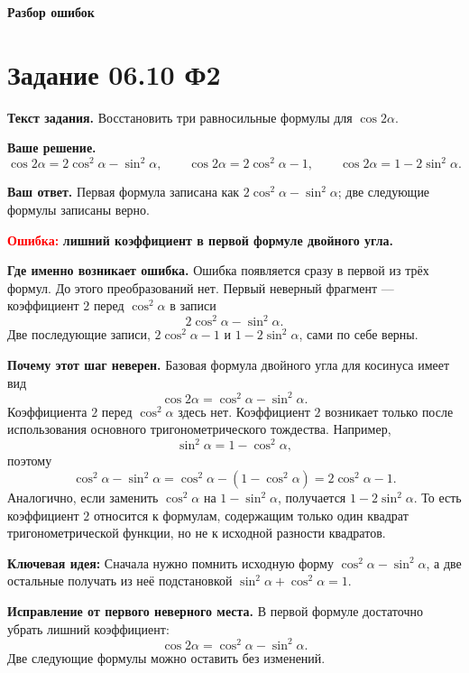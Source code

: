 \documentclass[12pt,a4paper]{article}
\newcommand{\errorlabel}[1]{\textcolor{red}{\textbf{Ошибка:}} \textbf{#1}}
\newcommand{\keyidea}{\textcolor{blue!60!black}{\textbf{Ключевая идея:}}}
\begin{document}
\newpage
\thispagestyle{review}
\vspace*{0.34\textheight}
\begin{center}
{\LARGE\bfseries Разбор ошибок}
\end{center}
\newpage

\label{task:0610f2}
\section*{Задание 06.10 Ф2}

\textbf{Текст задания.} Восстановить три равносильные формулы для $\cos 2\alpha$.

\textbf{Ваше решение.}
\[
\cos 2\alpha=2\cos^2\alpha-\sin^2\alpha,
\qquad
\cos 2\alpha=2\cos^2\alpha-1,
\qquad
\cos 2\alpha=1-2\sin^2\alpha.
\]

\textbf{Ваш ответ.} Первая формула записана как $2\cos^2\alpha-\sin^2\alpha$; две следующие формулы записаны верно.

\errorlabel{лишний коэффициент в первой формуле двойного угла.}

\textbf{Где именно возникает ошибка.} Ошибка появляется сразу в первой из трёх формул. До этого преобразований нет. Первый неверный фрагмент --- коэффициент $2$ перед $\cos^2\alpha$ в записи
\[
2\cos^2\alpha-\sin^2\alpha.
\]
Две последующие записи, $2\cos^2\alpha-1$ и $1-2\sin^2\alpha$, сами по себе верны.

\textbf{Почему этот шаг неверен.} Базовая формула двойного угла для косинуса имеет вид
\[
\cos 2\alpha=\cos^2\alpha-\sin^2\alpha.
\]
Коэффициента $2$ перед $\cos^2\alpha$ здесь нет. Коэффициент $2$ возникает только после использования основного тригонометрического тождества. Например,
\[
\sin^2\alpha=1-\cos^2\alpha,
\]
поэтому
\[
\cos^2\alpha-\sin^2\alpha
=\cos^2\alpha-(1-\cos^2\alpha)
=2\cos^2\alpha-1.
\]
Аналогично, если заменить $\cos^2\alpha$ на $1-\sin^2\alpha$, получается $1-2\sin^2\alpha$. То есть коэффициент $2$ относится к формулам, содержащим только один квадрат тригонометрической функции, но не к исходной разности квадратов.

\keyidea{} Сначала нужно помнить исходную форму $\cos^2\alpha-\sin^2\alpha$, а две остальные получать из неё подстановкой $\sin^2\alpha+\cos^2\alpha=1$.

\textbf{Исправление от первого неверного места.} В первой формуле достаточно убрать лишний коэффициент:
\[
\boxed{\cos 2\alpha=\cos^2\alpha-\sin^2\alpha}.
\]
Две следующие формулы можно оставить без изменений.
\end{document}
